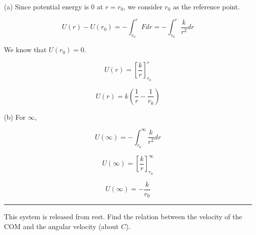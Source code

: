 \documentclass[twocolumn]{article}
\begin{document}
\begin{CJK*}{UTF8}{gbsn}
(a) Since potential energy is 0 at \(r = r_0\), we consider \(r_0\) as the reference point. 

\[
    U(r) - U(r_0) = -\int_{r_0} ^{r} F dr =  - \int_{r_0} ^{r} \dfrac{k}{r^{2} } dr
\]

We know that \(U (r_0) = 0\). 

\[
    U(r) = [\frac{k}{r}]_{r_0} ^{r} 
\]

\[
    \boxed{U(r) = k (\frac{1}{r} - \frac{1}{r_0})}
\]

(b) For \(\infty\), 

\[
    U(\infty) = - \int_{r_0} ^{\infty} \frac{k}{r^{2} } dr 
\]

\[
    U(\infty) = [\frac{k}{r}]_{r_0} ^{\infty}
\]

\[
    \boxed{U(\infty) = - \frac{k}{r_0}}
\]

\vspace{0.1in}
\hrule

\begin{question}
    This system is released from rest. Find the relation between the velocity of the COM and the angular velocity (about \(C\)).
    \begin{center}
    \end{center}
\end{question}


\end{CJK*}
\end{document}
